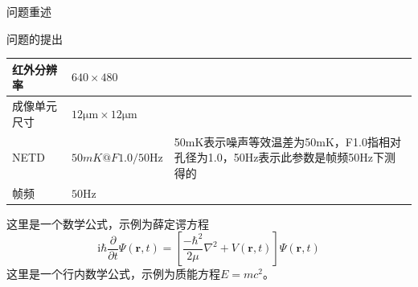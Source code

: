 \documentclass[11pt]{article}
\begin{document}
\begin{section}{问题重述}
\begin{subsection}{问题的提出}
\begin{table}[H]
\begin{tabular}{|m{}<{\centering}|m{}<{\centering}|m{}<{\raggedright\arraybackslash}|}
       红外分辨率  & $ 640 \times 480$                &                                                         \\\hline
       成像单元尺寸 & $12\unit{\um}\times12\unit{\um}$ &                                                         \\\hline
       NETD   & $50\unit{mK}@F1.0/50\unit{\Hz}$  & {50mK表示噪声等效温差为50mK，F1.0指相对孔径为1.0，50Hz表示此参数是帧频50Hz下测得的 } \\\hline
       帧频     & $50\unit{\Hz}$                   &                                                         \\\hline
     \end{tabular}
   \end{table}
 \end{subsection}
 这里是一个数学公式，示例为薛定谔方程
 \begin{equation}
   \label{eq:薛定谔方程}
   \mathrm{i}\hbar\frac{\partial}{\partial t}\Psi(\mathbf{r},t)=\left[\frac{-\hbar^2}{2\mu}\nabla^2+V(\mathbf{r},t)\right]\Psi(\mathbf{r},t)
 \end{equation}
 这里是一个行内数学公式，示例为质能方程$E=mc^2$。
\end{section}
\printbibliography[heading=bibliography,title=\centering 参考文献]
\end{document}

